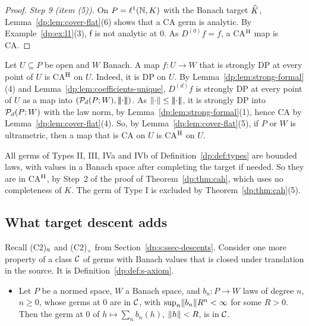 \begin{proof}
\emph{Step 9 (item (5)).} On $P=\ell^1(\mathbb N,K)$ with the Banach target $\widehat K$, Lemma~\ref{dp:lem:cover-flat}(6) shows that a CA germ is analytic. By Example~\ref{dp:ex:l1}(3), $\mathsf f$ is not analytic at $0$. As $D^{(0)}f=f$, a CA$^{\rm H}$ map is CA.
\end{proof}

\begin{remark}\label{dp:rem:cah-um}
Let $U\subseteq P$ be open and $W$ Banach. A map $f\colon U\to W$ that is strongly DP at every point of $U$ is CA$^{\rm H}$ on $U$. Indeed, it is DP on $U$. By Lemma~\ref{dp:lem:strong-formal}(4) and Lemma~\ref{dp:lem:coefficients-unique}, $D^{(d)}f$ is strongly DP at every point of $U$ as a map into $(\mathcal P_d(P;W),\lvert\!\lvert\!\lvert\cdot\rvert\!\rvert\!\rvert)$. As $\lVert \cdot\rVert\le\lvert\!\lvert\!\lvert\cdot\rvert\!\rvert\!\rvert$, it is strongly DP into $\mathcal P_d(P;W)$ with the law norm, by Lemma~\ref{dp:lem:strong-formal}(1), hence CA by Lemma~\ref{dp:lem:cover-flat}(4). So, by Lemma~\ref{dp:lem:cover-flat}(5), if $P$ or $W$ is ultrametric, then a map that is CA on $U$ is CA$^{\rm H}$ on $U$.
\end{remark}

\begin{remark}\label{dp:rem:cah-types}
All germs of Types II, III, IVa and IVb of Definition~\ref{dp:def:types} are bounded laws, with values in a Banach space after completing the target if needed. So they are in CA$^{\rm H}$, by Step~2 of the proof of Theorem~\ref{dp:thm:cah}, which uses no completeness of $K$. The germ of Type I is excluded by Theorem~\ref{dp:thm:cah}(5).
\end{remark}

\subsection{What target descent adds}\label{dp:ssec:ca-descents}

Recall (C2)$_{\rm u}$ and (C2)$_\times$ from Section~\ref{dp:s:ssec-descents}. Consider one more property of a class $\mathcal{C}$ of germs with Banach values that is closed under translation in the source. It is Definition~\ref{dp:def:s-axiom}.
\begin{itemize}
\item[(S)] Let $P$ be a normed space, $W$ a Banach space, and $b_n\colon P\to W$ laws of degree $n$, $n\ge0$, whose germs at $0$ are in $\mathcal{C}$, with $\sup_n\lVert b_n\rVert R^n<\infty$ for some $R>0$. Then the germ at $0$ of $h\mapsto\sum_nb_n(h)$, $\lVert h\rVert<R$, is in $\mathcal{C}$.
\end{itemize}

